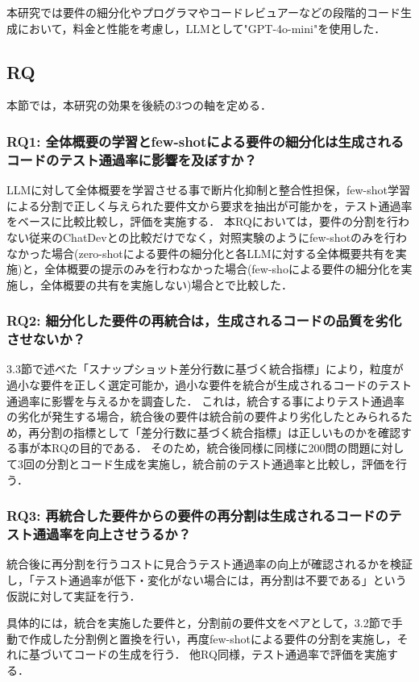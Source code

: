 \documentclass[submit,techrep,noauthor]{ipsj}
\begin{document}
本研究では要件の細分化やプログラマやコードレビュアーなどの段階的コード生成において，料金と性能を考慮し，LLMとして"GPT-4o-mini"\cite{openai_gpt_4o_mini}を使用した．


\subsection{RQ}
本節では，本研究の効果を後続の3つの軸を定める．

\subsubsection{RQ1: 全体概要の学習とfew-shotによる要件の細分化は生成されるコードのテスト通過率に影響を及ぼすか？}
LLMに対して全体概要を学習させる事で断片化抑制と整合性担保，few-shot学習による分割で正しく与えられた要件文から要求を抽出が可能かを，テスト通過率をベースに比較比較し，評価を実施する．
本RQにおいては，要件の分割を行わない従来のChatDevとの比較だけでなく，対照実験のようにfew-shotのみを行わなかった場合(zero-shotによる要件の細分化と各LLMに対する全体概要共有を実施)と，全体概要の提示のみを行わなかった場合(few-shoによる要件の細分化を実施し，全体概要の共有を実施しない)場合とで比較した．

\subsubsection{RQ2: 細分化した要件の再統合は，生成されるコードの品質を劣化させないか？}
3.3節で述べた「スナップショット差分行数に基づく統合指標」により，粒度が過小な要件を正しく選定可能か，過小な要件を統合が生成されるコードのテスト通過率に影響を与えるかを調査した．
これは，統合する事によりテスト通過率の劣化が発生する場合，統合後の要件は統合前の要件より劣化したとみられるため，再分割の指標として「差分行数に基づく統合指標」は正しいものかを確認する事が本RQの目的である．
そのため，統合後同様に同様に200問の問題に対して3回の分割とコード生成を実施し，統合前のテスト通過率と比較し，評価を行う．


\subsubsection{RQ3: 再統合した要件からの要件の再分割は生成されるコードのテスト通過率を向上させうるか？}
統合後に再分割を行うコストに見合うテスト通過率の向上が確認されるかを検証し，「テスト通過率が低下・変化がない場合には，再分割は不要である」という仮説に対して実証を行う．

具体的には，統合を実施した要件と，分割前の要件文をペアとして，3.2節で手動で作成した分割例と置換を行い，再度few-shotによる要件の分割を実施し，それに基づいてコードの生成を行う．
他RQ同様，テスト通過率で評価を実施する．
\end{document}
